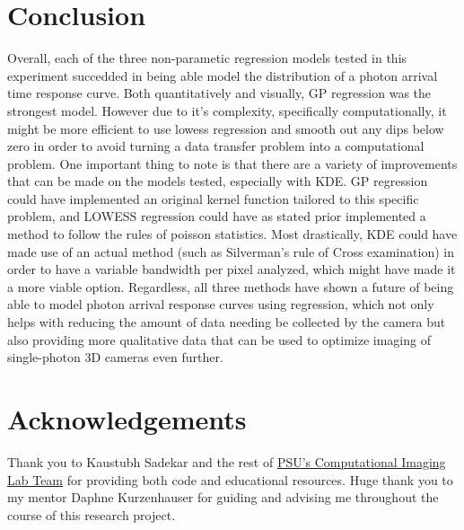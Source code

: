 \documentclass[letterpaper,12pt]{article}
\begin{document}
\begin{table}[H]
\centering
{}
\caption{Error statistics for EDH}
\end{table}

\section{Conclusion}
Overall, each of the three non-parametic regression models tested in this experiment succedded 
in being able model the distribution of a photon arrival time response curve. Both quantitatively
and visually, GP regression was the strongest model. However due to it's complexity, specifically 
computationally, it might be more efficient to use lowess regression and smooth out any dips 
below zero in order to avoid turning a data transfer problem into a computational problem. One
important thing to note is that there are a variety of improvements that can be made on the models
tested, especially with KDE. GP regression could have implemented an original kernel function
tailored to this specific problem, and LOWESS regression could have as stated prior implemented
a method to follow the rules of poisson statistics. Most drastically, KDE could have made use
of an actual method (such as Silverman's rule of Cross examination) in order to have a variable
bandwidth per pixel analyzed, which might have made it a more viable option. Regardless, all
three methods have shown a future of being able to model photon arrival response curves using
regression, which not only helps with reducing the amount of data needing be collected by the
camera but also providing more qualitative data that can be used to optimize imaging of
single-photon 3D cameras even further.

\section{Acknowledgements}
Thank you to Kaustubh Sadekar and the rest of 
\href{https://www.computational.camera/team}{PSU's Computational Imaging Lab Team} for providing
both code and educational resources. Huge thank you to my mentor Daphne Kurzenhauser for guiding 
and advising me throughout the course of this research project.

\printbibliography
\end{document}
